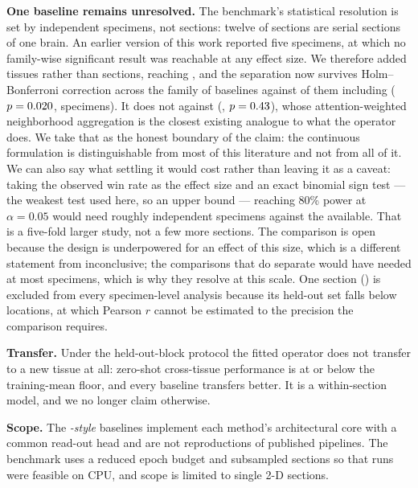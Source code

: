 \textbf{One baseline remains unresolved.} The benchmark's statistical resolution
is set by independent specimens, not sections: twelve of \MSSections{} sections
are serial sections of one brain. An earlier version of this work reported five
specimens, at which no family-wise significant result was reachable at any effect
size. We therefore added tissues rather than sections, reaching \MSSpecimens{},
and the separation now survives Holm--Bonferroni correction across the family of \MSNBaselines{} baselines against \MSSpecNSig{} of them
including \MSSpecGraphSig{} ($p = 0.020$,
\MSSpecGraphSigWins{} specimens). It does not against
\MSSpecGraphWorstModel{} (\MSSpecGraphWins{}, $p = 0.43$), whose
attention-weighted neighborhood aggregation is the closest existing analogue to
what the operator does. We take that as the honest boundary of the claim: the
continuous formulation is distinguishable from most of this literature and not
from all of it. We can also say what settling it would cost rather than
leaving it as a caveat: taking the observed win rate as the effect size and an
exact binomial sign test --- the weakest test used here, so an upper bound ---
reaching 80\% power at $\alpha = 0.05$ would need roughly \PowerStagateN{}
independent specimens against the \MSSpecimens{} available. That is a five-fold
larger study, not a few more sections. The comparison is open because the design
is underpowered for an effect of this size, which is a different statement from
inconclusive; the comparisons that do separate would have needed at most
\PowerSigMaxN{} specimens, which is why they resolve at this scale. One section (\MSExcluded) is excluded from every specimen-level
analysis because its held-out set falls below \MSMinHeldOut{} locations, at which
Pearson $r$ cannot be estimated to the precision the comparison requires.

\textbf{Transfer.} Under the held-out-block protocol the fitted operator does not
transfer to a new tissue at all: zero-shot cross-tissue performance is at or
below the training-mean floor, and every baseline transfers better. It is a
within-section model, and we no longer claim otherwise.

\textbf{Scope.} The \emph{-style} baselines implement each method's
architectural core with a common read-out head and are not reproductions of
published pipelines. The benchmark uses a reduced epoch budget and subsampled
sections so that \MSRuns{} runs were feasible on CPU, and scope is limited to
single 2-D sections.

\iffullpaper\else\label{endofmain}\fi
